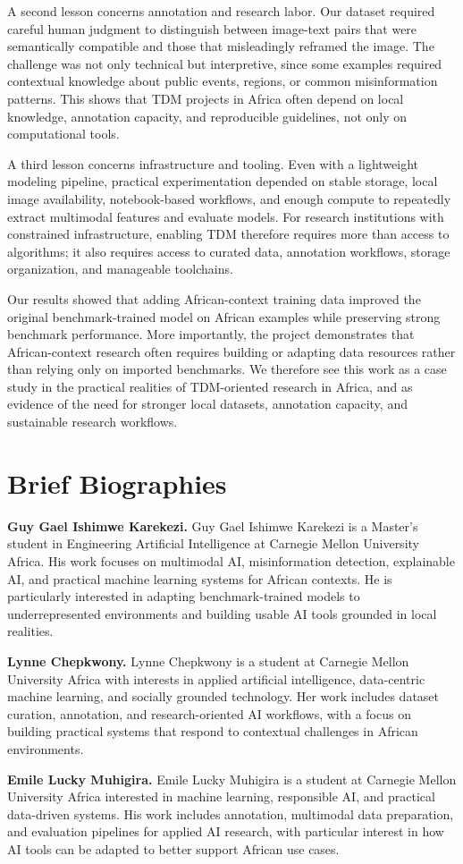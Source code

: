 \documentclass[11pt]{article}
\begin{document}
A second lesson concerns annotation and research labor. Our dataset required careful human judgment to distinguish between image-text pairs that were semantically compatible and those that misleadingly reframed the image. The challenge was not only technical but interpretive, since some examples required contextual knowledge about public events, regions, or common misinformation patterns. This shows that TDM projects in Africa often depend on local knowledge, annotation capacity, and reproducible guidelines, not only on computational tools.

A third lesson concerns infrastructure and tooling. Even with a lightweight modeling pipeline, practical experimentation depended on stable storage, local image availability, notebook-based workflows, and enough compute to repeatedly extract multimodal features and evaluate models. For research institutions with constrained infrastructure, enabling TDM therefore requires more than access to algorithms; it also requires access to curated data, annotation workflows, storage organization, and manageable toolchains.

Our results showed that adding African-context training data improved the original benchmark-trained model on African examples while preserving strong benchmark performance. More importantly, the project demonstrates that African-context research often requires building or adapting data resources rather than relying only on imported benchmarks. We therefore see this work as a case study in the practical realities of TDM-oriented research in Africa, and as evidence of the need for stronger local datasets, annotation capacity, and sustainable research workflows.

\section*{Brief Biographies}
\textbf{Guy Gael Ishimwe Karekezi.} Guy Gael Ishimwe Karekezi is a Master's student in Engineering Artificial Intelligence at Carnegie Mellon University Africa. His work focuses on multimodal AI, misinformation detection, explainable AI, and practical machine learning systems for African contexts. He is particularly interested in adapting benchmark-trained models to underrepresented environments and building usable AI tools grounded in local realities.

\textbf{Lynne Chepkwony.} Lynne Chepkwony is a student at Carnegie Mellon University Africa with interests in applied artificial intelligence, data-centric machine learning, and socially grounded technology. Her work includes dataset curation, annotation, and research-oriented AI workflows, with a focus on building practical systems that respond to contextual challenges in African environments.

\textbf{Emile Lucky Muhigira.} Emile Lucky Muhigira is a student at Carnegie Mellon University Africa interested in machine learning, responsible AI, and practical data-driven systems. His work includes annotation, multimodal data preparation, and evaluation pipelines for applied AI research, with particular interest in how AI tools can be adapted to better support African use cases.
\end{document}
